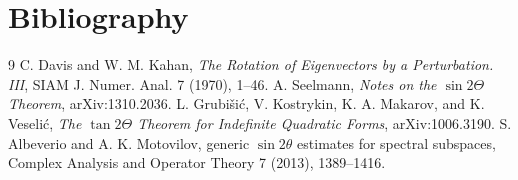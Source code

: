 \section*{Bibliography}
\begin{thebibliography}{9}
 C. Davis and W. M. Kahan, \emph{The Rotation of Eigenvectors by a Perturbation. III}, SIAM J. Numer. Anal. 7 (1970), 1--46.
 A. Seelmann, \emph{Notes on the $\sin 2\Theta$ Theorem}, arXiv:1310.2036.
 L. Grubi\v{s}i\'c, V. Kostrykin, K. A. Makarov, and K. Veseli\'c, \emph{The $\tan 2\Theta$ Theorem for Indefinite Quadratic Forms}, arXiv:1006.3190.
 S. Albeverio and A. K. Motovilov, generic $\sin 2\theta$ estimates for spectral subspaces, Complex Analysis and Operator Theory 7 (2013), 1389--1416.
\end{thebibliography}


